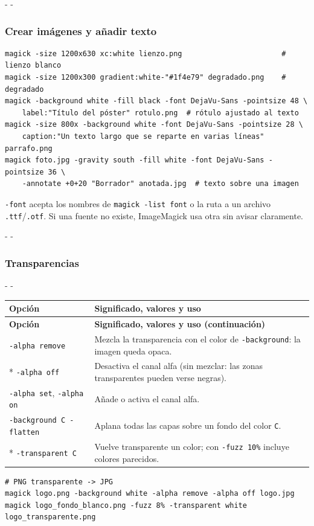 \documentclass[11pt,a4paper]{article}
\makeatletter
\newcommand{\necesitaespacio}[1]{\par\penalty-100\begingroup
	\setlength{\dimen@}{#1}\dimen@ii\pagegoal\advance\dimen@ii-\pagetotal
	\ifdim\dimen@>\dimen@ii\ifdim\dimen@ii>\z@\vfil\fi\penalty-\@M\fi\endgroup}
\newenvironment{opciones}[1][Opción]{%
	\par\begingroup\small
	\begin{longtable}{L{4.25cm}L{11.2cm}}
		\toprule\rowcolor{tablacab}\cab{#1} & \cab{Significado, valores y uso} \\ \midrule
		\endfirsthead
		\toprule\rowcolor{tablacab}\cab{#1} & \cab{Significado, valores y uso (continuación)} \\ \midrule
		\endhead
		\bottomrule
		\endfoot}
	{\end{longtable}\endgroup}
\newcommand{\cmd}[1]{\texttt{\textcolor{colcmd}{#1}}}      %
\newcommand{\opt}[1]{\texttt{\textcolor{colopt}{#1}}}      %
\newcommand{\arch}[1]{\texttt{\textcolor{colarch}{#1}}}    %
\newcommand{\val}[1]{\texttt{#1}}                          %
\newcommand{\cab}[1]{\textbf{#1}}
\makeatother
\begin{document}
	\necesitaespacio{6\baselineskip}
	\subsubsection{Crear imágenes y añadir texto}
	
	\begin{lstlisting}
magick -size 1200x630 xc:white lienzo.png                       # lienzo blanco
magick -size 1200x300 gradient:white-"#1f4e79" degradado.png    # degradado
magick -background white -fill black -font DejaVu-Sans -pointsize 48 \
    label:"Título del póster" rotulo.png  # rótulo ajustado al texto
magick -size 800x -background white -font DejaVu-Sans -pointsize 28 \
    caption:"Un texto largo que se reparte en varias líneas" parrafo.png
magick foto.jpg -gravity south -fill white -font DejaVu-Sans -pointsize 36 \
    -annotate +0+20 "Borrador" anotada.jpg  # texto sobre una imagen
\end{lstlisting}
	
	\opt{-font} acepta los nombres de \cmd{magick -list font} o la ruta a un archivo \arch{.ttf}/\arch{.otf}. Si una fuente no existe, ImageMagick usa otra sin avisar claramente.
	
	\necesitaespacio{20\baselineskip}
	\subsubsection{Transparencias}
	
	\necesitaespacio{16\baselineskip}
	\begin{opciones}
		\opt{-alpha remove} & Mezcla la transparencia con el color de \opt{-background}: la imagen queda opaca.\\*
		\opt{-alpha off} & Desactiva el canal alfa (sin mezclar: las zonas transparentes pueden verse negras).\\
		\opt{-alpha set}, \opt{-alpha on} & Añade o activa el canal alfa.\\
		\opt{-background C -flatten} & Aplana todas las capas sobre un fondo del color \val{C}.\\*
		\opt{-transparent C} & Vuelve transparente un color; con \opt{-fuzz 10\%} incluye colores parecidos.\\
	\end{opciones}
	
	\begin{lstlisting}
# PNG transparente -> JPG
magick logo.png -background white -alpha remove -alpha off logo.jpg
magick logo_fondo_blanco.png -fuzz 8% -transparent white logo_transparente.png
\end{lstlisting}
	
\end{document}
